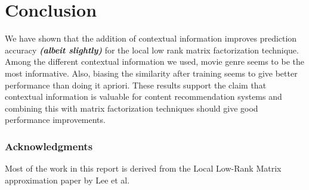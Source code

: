 \documentclass[10 pt,table]{article}  %
\begin{document}
\section{Conclusion}
We have shown that the addition of contextual information improves prediction accuracy \textbf{\emph{(albeit slightly)}} for the local low rank matrix factorization technique. Among the different contextual information we used, movie genre seems to be the most informative. Also, biasing the similarity after training seems to give better performance than doing it apriori. These results support the claim that contextual information is valuable for content recommendation systems and combining this with matrix factorization techniques should give good performance improvements.

\subsubsection*{Acknowledgments}
Most of the work in this report is derived from the Local Low-Rank Matrix approximation paper \cite{lee2013local} by Lee et al.



\end{document}
